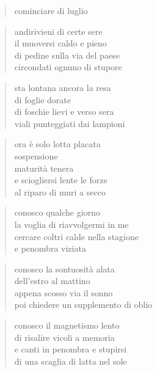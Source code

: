 \begin{verse}
    cominciare di luglio
\end{verse}

\begin{verse}
    andirivieni di certe sere\\
    il muoversi caldo e pieno\\
    di pedine sulla via del paese\\
    circondati ognuno di stupore
\end{verse}

\begin{verse}
    sta lontana ancora la resa\\
    di foglie dorate\\
    di foschie lievi e verso sera\\
    viali punteggiati dai lampioni
\end{verse}

\begin{verse}
    ora è solo lotta placata\\
    sospensione\\
    maturità tenera\\
    e sciogliersi lente le forze\\
    al riparo di muri a secco
\end{verse}

\clearpage


\begin{verse}
    conosco qualche giorno\\
    la voglia di riavvolgermi in me\\
    cercare coltri calde nella stagione\\
    e penombra viziata
\end{verse}

\begin{verse}
    conosco la sontuosità alata\\
    dell'estro al mattino\\
    appena scosso via il sonno\\
    poi chiedere un supplemento di oblio
\end{verse}

\begin{verse}
    conosco il magnetismo lento\\
    di risalire vicoli a memoria\\
    e canti in penombra e stupirsi\\
    di una scaglia di latta nel sole
\end{verse}

